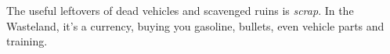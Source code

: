 
The useful leftovers of dead vehicles and scavenged ruins is \emph{scrap}. In the Wasteland, it's a currency, buying you gasoline, bullets, even vehicle parts and training.